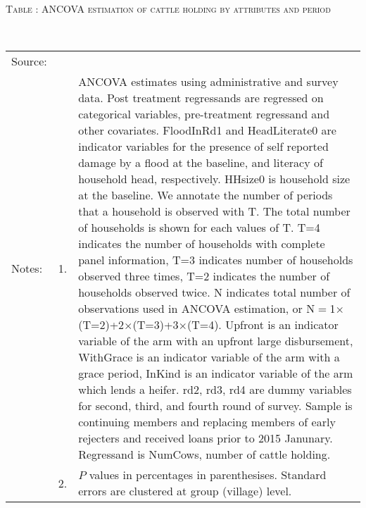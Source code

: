 \hspace{-1cm}\begin{minipage}[t]{14cm}
\hfil\textsc{\normalsize Table \thetable: ANCOVA estimation of cattle holding by attributes and period\label{tab ANCOVA cow time varying attributes}}\\
\setlength{\tabcolsep}{1pt}
\setlength{\baselineskip}{8pt}
\renewcommand{\arraystretch}{.55}
\hfil{}\\
\renewcommand{\arraystretch}{.8}
\setlength{\tabcolsep}{1pt}
\begin{tabular}{>{\hfill\scriptsize}p{1cm}<{}>{\hfill\scriptsize}p{.25cm}<{}>{\scriptsize}p{12cm}<{\hfill}}
Source:& \multicolumn{2}{l}{\scriptsize Estimated with GUK administrative and survey data.}\\
Notes: & 1. & ANCOVA estimates using administrative and survey data. Post treatment regressands are regressed on categorical variables, pre-treatment regressand and other covariates. \textsf{FloodInRd1} and \textsf{HeadLiterate0} are indicator variables for the presence of self reported damage by a flood at the baseline, and literacy of household head, respectively. \textsf{HHsize0} is household size at the baseline. We annotate the number of periods that a household is observed with \textsf{T}. The total number of households is shown for each values of \textsf{T}. \textsf{T=4} indicates the number of households with complete panel information, \textsf{T=3} indicates number of households observed three times, \textsf{T=2} indicates the number of households observed twice. \textsf{N} indicates total number of observations used in ANCOVA estimation, or \textsf{N$=$1$\times$(T=2)+2$\times$(T=3)+3$\times$(T=4)}.  \textsf{Upfront} is an indicator variable of the arm with an upfront large disbursement, \textsf{WithGrace} is an indicator variable of the arm with a grace period, \textsf{InKind} is an indicator variable of the arm which lends a heifer. \textsf{rd2, rd3, rd4} are dummy variables for second, third, and fourth round of survey. Sample is continuing members and replacing members of early rejecters and received loans prior to 2015 Janunary. Regressand is \textsf{NumCows}, number of cattle holding. \\
& 2. & $P$ values in percentages in parenthesises. Standard errors are clustered at group (village) level.
\end{tabular}
\end{minipage}

